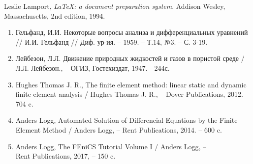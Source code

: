 \begin{center}
\end{center}

\begin{thebibliography}{9}  Leslie Lamport, \emph{\LaTeX: a document preparation system}. Addison Wesley, Massachusetts, 2nd edition, 1994. \end{thebibliography}

\begin{enumerate}
    \item Гельфанд, И.И. Некоторые вопросы анализа и дифференциальных уравнений // И.И. Гельфанд  // Диф. ур-ия. -- 1959. -- Т.14, №3. -- С. 3-19.
    \item Лейбезон, Л.Л. Движение природных жидкостей и газов в пористой среде / Л.Л. Лейбезон., -- ОГИЗ, Гостехиздат, 1947. - 244с.
    \item Hughes Thomas J. R.,
			{The finite element method: linear static and dynamic finite element analysis} / 
			Hughes Thomas J. R., -- Dover Publications, 2012. -- 704 c.
    \item Anders Logg,
			{Automated Solution of Differencial Equations by the Finite Element Method} /
			Anders Logg, -- Rent Publications, 2014. -- 600 c.
    \item Anders Logg,
        {The FEniCS Tutorial Volume I} /
        Anders Logg, -- \\ Rent Publications, 2017, -- 150 c.
\end{enumerate}
